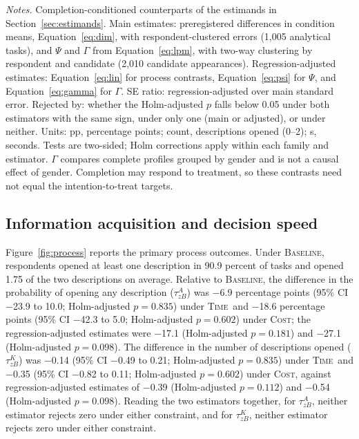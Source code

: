 \documentclass[11pt]{article}\usepackage[]{graphicx}\usepackage[]{xcolor}
\newcommand{\armT}{\textsc{Time}}
\newcommand{\armC}{\textsc{Cost}}
\newcommand{\armB}{\textsc{Baseline}}
\newenvironment{notes}{\par\smallskip\begin{minipage}{\linewidth}\footnotesize\textit{Notes.}}{\end{minipage}}
\begin{document}
\begin{table}[!htbp]
\begin{notes}
Completion-conditioned counterparts of the estimands in Section~\ref{sec:estimands}. Main estimates: preregistered differences in condition means, Equation~\eqref{eq:dim}, with respondent-clustered errors (1,005 analytical tasks), and $\Psi$ and $\Gamma$ from Equation~\eqref{eq:lpm}, with two-way clustering by respondent and candidate (2,010 candidate appearances). Regression-adjusted estimates: Equation~\eqref{eq:lin} for process contrasts, Equation~\eqref{eq:psi} for $\Psi$, and Equation~\eqref{eq:gamma} for $\Gamma$. SE ratio: regression-adjusted over main standard error. Rejected by: whether the Holm-adjusted $p$ falls below 0.05 under both estimators with the same sign, under only one (main or adjusted), or under neither. Units: pp, percentage points; count, descriptions opened (0--2); s, seconds. Tests are two-sided; Holm corrections apply within each family and estimator. $\Gamma$ compares complete profiles grouped by gender and is not a causal effect of gender. Completion may respond to treatment, so these contrasts need not equal the intention-to-treat targets.
\end{notes}
\end{table}

\subsection{Information acquisition and decision speed}

Figure~\ref{fig:process} reports the primary process outcomes. Under \armB, respondents opened at least one description in 90.9 percent of tasks and opened 1.75 of the two descriptions on average. Relative to \armB, the difference in the probability of opening any description ($\tau^A_{zB}$) was $-$6.9 percentage points (95\% CI $-$23.9 to 10.0; Holm-adjusted $p=0.835$) under \armT\ and $-$18.6 percentage points (95\% CI $-$42.3 to 5.0; Holm-adjusted $p=0.602$) under \armC; the regression-adjusted estimates were $-$17.1 (Holm-adjusted $p=0.181$) and $-$27.1 (Holm-adjusted $p=0.098$). The difference in the number of descriptions opened ($\tau^K_{zB}$) was $-$0.14 (95\% CI $-$0.49 to 0.21; Holm-adjusted $p=0.835$) under \armT\ and $-$0.35 (95\% CI $-$0.82 to 0.11; Holm-adjusted $p=0.602$) under \armC, against regression-adjusted estimates of $-$0.39 (Holm-adjusted $p=0.112$) and $-$0.54 (Holm-adjusted $p=0.098$). Reading the two estimators together, for $\tau^{A}_{zB}$, neither estimator rejects zero under either constraint, and for $\tau^{K}_{zB}$, neither estimator rejects zero under either constraint.
\end{document}
